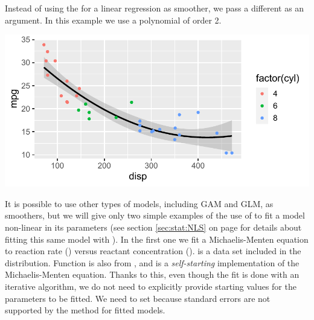 \documentclass[krantz2]{krantz}\usepackage{knitr}
\begin{document}
Instead of using the  for a linear regression as smoother, we pass a different  as an argument. In this example we use a polynomial of order 2.

\begin{knitrout}\footnotesize
{}\color{fgcolor}\begin{kframe}
\begin{alltt}
\hlstd{(}  \hlstd{(}     \hlstd{=}  \hlopt{+}
  \hlstd{(} \hlstd{=} \hlstd{,}   \hlopt{~}  \hlstd{),}  \hlstd{=} \hlstd{)} \hlopt{+}
  \hlstd{()}
\end{alltt}
\end{kframe}

{\centering \includegraphics[width=.7\textwidth]{figure/pos-smooth-plot-06-1}

}



\end{knitrout}

It is possible to use other types of models, including GAM and GLM, as smoothers, but we will give only two simple examples of the use of  to fit a model non-linear in its parameters (see section \ref{sec:stat:NLS} on page \pageref{sec:stat:NLS} for details about fitting this same model with ). In the first one we fit a Michaelis-Menten equation to reaction rate () versus reactant concentration ().  is a data set included in the \Rlang distribution. Function  is also from \Rlang, and is a \emph{self-starting} implementation of the Michaelis-Menten equation. Thanks to this, even though the fit is done with an iterative algorithm, we do not need to explicitly provide starting values for the parameters to be fitted. We need to set  because standard errors are not supported by the  method for  fitted models.
\end{document}
